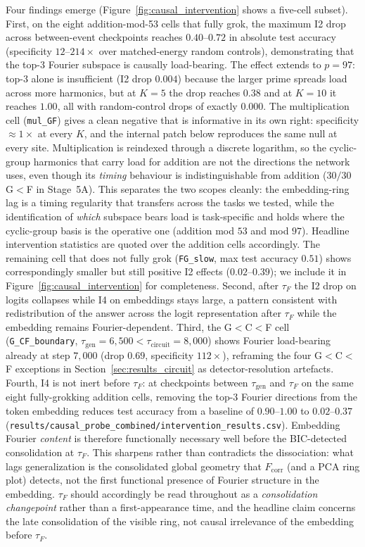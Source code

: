 \documentclass{article}
\newcommand{\taug}{\tau_{\mathrm{gen}}}
\newcommand{\tauf}{\tau_{F}}
\newcommand{\taucirc}{\tau_{\mathrm{circuit}}}
\newcommand{\fcorr}{F_{\mathrm{corr}}}
\begin{document}
Four findings emerge (Figure~\ref{fig:causal_intervention}
shows a five-cell subset).
First, on the eight addition-mod-53 cells that fully grok,
the maximum I2 drop across between-event checkpoints reaches
$0.40$--$0.72$ in absolute test accuracy (specificity
$12$--$214\times$ over matched-energy random controls),
demonstrating that the top-$3$ Fourier subspace is causally
load-bearing.
The effect extends to $p{=}97$: top-3 alone is insufficient
(I2 drop $0.004$) because the larger prime spreads load across
more harmonics, but at $K{=}5$ the drop reaches $0.38$ and at
$K{=}10$ it reaches $1.00$, all with random-control drops of
exactly $0.000$.
The multiplication cell (\texttt{mul\_GF}) gives a clean negative
that is informative in its own right: specificity ${\approx}1\times$
at every $K$, and the internal patch below reproduces the same
null at every site.
Multiplication is reindexed through a discrete logarithm, so the
cyclic-group harmonics that carry load for addition are not the
directions the network uses, even though its \emph{timing}
behaviour is indistinguishable from addition ($30/30$ G$<$F in
Stage~5A).
This separates the two scopes cleanly: the embedding-ring lag is
a timing regularity that transfers across the tasks we tested,
while the identification of \emph{which} subspace bears load is
task-specific and holds where the cyclic-group basis is the
operative one (addition mod $53$ and mod $97$).
Headline intervention statistics are quoted over the
addition cells accordingly.
The remaining cell that does not fully grok (\texttt{FG\_slow},
max test accuracy $0.51$) shows correspondingly smaller but still
positive I2 effects ($0.02$--$0.39$); we include it in
Figure~\ref{fig:causal_intervention} for completeness.
Second, after $\tauf$ the I2 drop on logits collapses while I4
on embeddings stays large, a pattern consistent with
redistribution of the answer across the logit representation
after $\tauf$ while the embedding remains Fourier-dependent.
Third, the G$<$C$<$F cell (\texttt{G\_CF\_boundary},
$\taug{=}6{,}500<\taucirc{=}8{,}000$) shows Fourier load-bearing
already at step $7{,}000$ (drop $0.69$, specificity $112\times$),
reframing the four G$<$C$<$F exceptions in
Section~\ref{sec:results_circuit} as detector-resolution artefacts.
Fourth, I4 is not inert before $\tauf$: at checkpoints between
$\taug$ and $\tauf$ on the same eight
fully-grokking addition cells, removing the top-$3$ Fourier
directions from the token embedding reduces test accuracy from
a baseline of $0.90$--$1.00$ to $0.02$--$0.37$
(\texttt{results/causal\_probe\_combined/intervention\_results.csv}).
Embedding Fourier \emph{content} is therefore functionally
necessary well before the BIC-detected consolidation at $\tauf$.
This sharpens rather than contradicts the dissociation: what lags
generalization is the consolidated global geometry that $\fcorr$
(and a PCA ring plot) detects, not the first functional presence
of Fourier structure in the embedding.
$\tauf$ should accordingly be read throughout as a
\emph{consolidation changepoint} rather than a first-appearance
time, and the headline claim concerns the late consolidation of
the visible ring, not causal irrelevance of the embedding before
$\tauf$.
\end{document}

